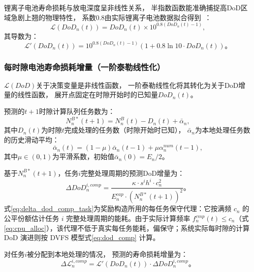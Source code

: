 \documentclass[a4paper,11pt]{article}
\begin{document}
锂离子电池寿命损耗与放电深度呈非线性关系，
半指数函数能准确捕捉高DoD区域急剧上翘的物理特性，
系数0.8由实际锂离子电池数据拟合得到~\cite{chen2025tasri}：
\begin{equation}
    \mathcal{L}(DoD_n(t)) = DoD_n(t) \times
    10^{0.8(DoD_n(t)-1)},
    \label{eq:health_loss}
\end{equation}
其导数为：
\begin{equation}
    \mathcal{L}'(DoD_n(t)) = 10^{0.8(DoD_n(t)-1)}
    \left(1 + 0.8\ln 10 \cdot DoD_n(t)\right)。
    \label{eq:health_loss_deriv}
\end{equation}

\subsubsection{每时隙电池寿命损耗增量（一阶泰勒线性化）}

$\mathcal{L}(DoD)$关于决策变量是非线性函数，
一阶泰勒线性化将其转化为关于DoD增量的线性函数，
展开点固定在时隙开始时的已知量$DoD_n(t)$。

预测的$t+1$时隙计算队列任务数为：
\begin{equation}
    N^{B*}_n(t+1) = N^B_n(t) - D_n(t) + \bar{\alpha}_n,
    \label{eq:QB_predict}
\end{equation}
其中$D_n(t)$为时隙$t$完成处理的任务数（时隙开始时已知），
$\bar{\alpha}_n$为本地处理任务数的历史滑动平均：
\begin{equation}
    \bar{\alpha}_n(t) = (1-\mu)\bar{\alpha}_n(t-1)
    + \mu\alpha^{num}_n(t-1),
    \label{eq:alpha_avg}
\end{equation}
其中$\mu \in (0,1)$为平滑系数，初始值$\bar{\alpha}_n(0) = E_n/2$。

基于$N^{B*}_n(t+1)$，任务$i$完整处理周期的预测DoD增量为：
\begin{equation}
    \Delta DoD^{i,comp}_n =
    \frac{\kappa \cdot s^i h^i \cdot c^2_n}
    {E^{cap}_n \cdot \left(N^{B*}_n(t+1)\right)^2}。
    \label{eq:delta_dod_comp_task}
\end{equation}
式\eqref{eq:delta_dod_comp_task}为奖励构造所用的每任务保守代理：它按满频 $c_n$ 的公平份额估计任务 $i$ 完整处理周期的能耗。由于实际计算频率 $f^{cmp}_n(t)\le c_n$（式\eqref{eq:cpu_alloc}），该代理不低于真实每任务能耗，偏保守；系统实际每时隙的计算 DoD 演进则按 DVFS 模型式\eqref{eq:dod_comp} 计算。

对任务$i$被分配到本地处理的情况，
预测的寿命损耗增量为：
\begin{equation}
    \Delta\mathcal{L}^{i,comp}_n =
    \mathcal{L}'(DoD_n(t)) \cdot
    \Delta DoD^{i,comp}_n。
    \label{eq:delta_L_comp}
\end{equation}
\end{document}

